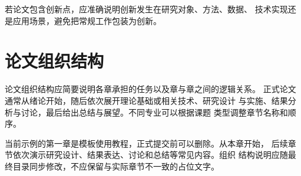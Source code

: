 若论文包含创新点，应准确说明创新发生在研究对象、方法、数据、
技术实现还是应用场景，避免把常规工作包装为创新。

\section{论文组织结构}

论文组织结构应简要说明各章承担的任务以及章与章之间的逻辑关系。
正式论文通常从绪论开始，随后依次展开理论基础或相关技术、研究设计
与实施、结果分析与讨论，最后给出总结与展望。不同专业可以根据课题
类型调整章节名称和顺序。

当前示例的第一章是模板使用教程，正式提交前可以删除。从本章开始，
后续章节依次演示研究设计、结果表达、讨论和总结等常见内容。组织
结构说明应随最终目录同步修改，不应保留与实际章节不一致的占位文字。
